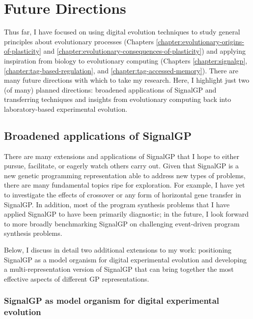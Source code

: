 \section{Future Directions}

Thus far, I have focused on using digital evolution techniques to study general principles about evolutionary processes (Chapters \ref{chapter:evolutionary-origins-of-plasticity} and \ref{chapter:evolutionary-consequences-of-plasticity}) and applying inspiration from biology to evolutionary computing (Chapters \ref{chapter:signalgp}, \ref{chapter:tag-based-regulation}, and \ref{chapter:tag-accessed-memory}).
There are many future directions with which to take my research.
Here, I highlight just two (of many) planned directions: broadened applications of SignalGP and transferring techniques and insights from evolutionary computing back into laboratory-based experimental evolution.

\subsection{Broadened applications of SignalGP}

There are many extensions and applications of SignalGP that I hope to either pursue, facilitate, or eagerly watch others carry out.
Given that SignalGP is a new genetic programming representation able to address new types of problems, there are many fundamental topics ripe for exploration.
For example, I have yet to investigate the effects of crossover or any form of horizontal gene transfer in SignalGP.
In addition, most of the program synthesis problems that I have applied SignalGP to have been primarily diagnostic; in the future, I look forward to more broadly benchmarking SignalGP on challenging event-driven program synthesis problems.  

Below, I discuss in detail two additional extensions to my work: positioning SignalGP as a model organism for digital experimental evolution and developing a multi-representation version of SignalGP that can bring together the most effective aspects of different GP representations.

\subsubsection{SignalGP as model organism for digital experimental evolution}

